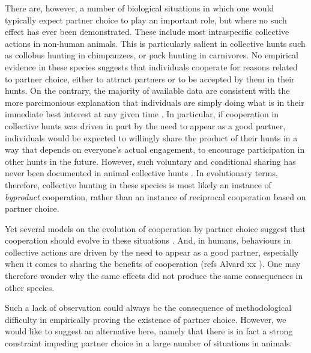 \documentclass[twocolumn]{article}
\begin{document}


There are, however, a number of biological situations in which one would typically expect partner choice to play an important role, but where no such effect has ever been demonstrated. These include most intraspecific collective actions in non-human animals. This is particularly salient in collective hunts such as collobus hunting in chimpanzees, or pack hunting in carnivores. No empirical evidence in these species suggests that individuals cooperate for reasons related to partner choice, either to attract partners or to be accepted by them in their hunts. On the contrary, the majority of available data are consistent with the more parcimonious explanation that individuals are simply doing what is in their immediate best interest at any given time \cite{Packer1986,Packer1988a, Melis2008, Melis2011}. In particular, if cooperation in collective hunts was driven in part by the need to appear as a good partner, individuals would be expected to  willingly share the product of their hunts in a way that depends on everyone's actual engagement, to encourage participation in other hunts in the future. However, such voluntary and conditional sharing has never been documented in animal collective hunts \cite{Melis2011}. In evolutionary terms, therefore, collective hunting in these species is most likely an instance of \textit{byproduct} cooperation, rather than an instance of reciprocal cooperation based on partner choice.

Yet several models on the evolution of cooperation by  partner choice suggest that cooperation should evolve in these situations \cite{McNamara2008, Aktipis2011, Barclay2011, Campenni2014}. And, in humans, behaviours in collective actions are driven by the need to appear as a good partner, especially when it comes to sharing the benefits of cooperation (refs Alvard xx \cite{Baumard2013a}). One may therefore wonder why the same effects did not produce the same consequences in other species.

Such a lack of observation could always be the consequence of methodological difficulty in empirically proving the existence of partner choice. However, we would like to suggest an alternative here, namely that there is in fact a strong constraint impeding partner choice in a large number of situations in animals.
\end{document}
